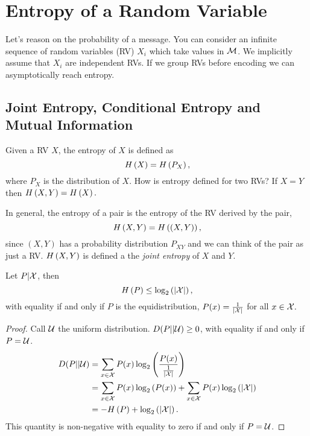
\chapter{Entropy of a Random Variable}

Let's reason on the probability of a message.
You can consider an infinite sequence of random variables (RV) $X_i$ which take values in $\mathcal{M}$.
We implicitly assume that $X_i$ are independent RVs.
If we group \acp{RV} before encoding we can asymptotically reach entropy.

\section{Joint Entropy, Conditional Entropy and Mutual Information}

Given a \ac{RV} $X$, the entropy of $X$ is defined as
\begin{equation*}
	H\left({X}\right) = H\left({P_X}\right),
\end{equation*}
where $P_X$ is the distribution of $X$.
How is entropy defined for two \acp{RV}?
If $X = Y$ then $H\left({X,Y}\right) = H\left({X}\right).$

\begin{definition}
	In general, the entropy of a pair is the entropy of the \ac{RV} derived by the pair, \ie
	\begin{equation*}
		H\left({X,Y}\right) = H\left({(X,Y)}\right), 
	\end{equation*}
	since $(X, Y)$ has a probability distribution $P_{XY}$ and we can think of the pair as just a \ac{RV}.
	$H\left({X,Y}\right)$ is defined a the \emph{joint entropy} of $X$ and $Y$. 
\end{definition}

\begin{prop}
	Let $P | \mathcal{X}$, then
	\begin{equation*}
		H\left({P}\right) \le \log_2 \left( \left|{\mathcal{X}}\right| \right),
	\end{equation*}
	with equality if and only if $P$ is the equidistribution, \ie $P(x) = \frac{1}{\left|{\mathcal{X}}\right|}$ for all $x \in \mathcal{X}.$
\end{prop}

\begin{proof}
	Call $\mathcal{U}$ the uniform distribution.
	$D(P||\mathcal{U})\ge 0$, with equality if and only if $P = \mathcal{U}$.
	\begin{align*}
		D(P||\mathcal{U})
		& =
		\sum_{x \in \mathcal{X}} P(x) \log_2 \left( \frac{P(x)}{\frac{1}{\left|{\mathcal{X}}\right|}} \right)
		\\
		& =
		\sum_{x \in \mathcal{X}} P(x) \log_2 \left( P(x) \right)
		+
		\sum_{x \in \mathcal{X}} P(x) \log_2 \left( \left|{\mathcal{X}}\right| \right)
		\\
		& =
		-H\left({P}\right) + \log_2 \left( \left|{\mathcal{X}}\right| \right).
	\end{align*}
	This quantity is non-negative with equality to zero if and only if $P = \mathcal{U}$.
\end{proof}

